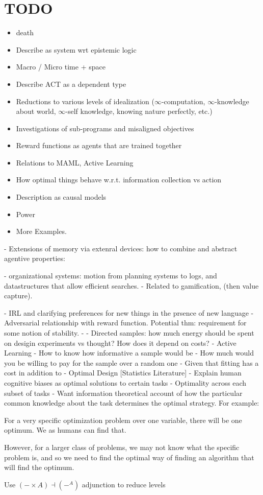 \documentclass{article}
\begin{document}
	\section{TODO}
	\begin{itemize}
		\item death
		\item Describe as system wrt epistemic logic
		\item Macro / Micro time + space
		\item Describe ACT as a dependent type
		\item Reductions to various levels of idealization ($\infty$-computation, $\infty$-knowledge about world, $\infty$-self knowledge, knowing nature perfectly, etc.)
		\item Investigations of sub-programs and misaligned objectives
		\item Reward functions as agents that are trained together
		\item Relations to MAML, Active Learning
		\item How optimal things behave w.r.t. information collection vs action
		\item Description as causal models
		\item Power
		\item More Examples.
	\end{itemize}



		- Extensions of memory via extenral devices: how to combine and abstract agentive properties:
	
		- organizational systems: motion from planning systems to logs, and datastructures that allow efficient searches.
		- Related to gamification, (then value capture).
		
		
		- IRL and clarifying preferences for new things in the prsence of new language
		- Adversarial relationship with reward function. Potential thm: requirement for some notion of stability.
		-
		- Directed samples: how much energy should be spent on desigin experiments vs thought? How does it depend on costs?
		- Active Learning
		- How to know how informative a sample would be
		- How much would you be willing to pay for the sample over a random one
		- Given that fitting has a cost in addition to
		- Optimal Design [Statistics Literature]
		- Explain human cognitive biases as optimal solutions to certain tasks
		- Optimality across each subset of tasks
		- Want information theoretical account of how the particular common knowledge about the task determines the optimal strategy.  For example:
		
		For a very specific optimization problem over one variable, there will be one optimum. We as humans can find that.
		
		However, for a larger class of problems, we may not know what the specific problem is, and so we need to find the optimal way of finding an algorithm that will find the optimum.
		
		Use $(- \times A) \dashv (-^A)$ adjunction to reduce levels

	
%	
	
%	
\end{document}
